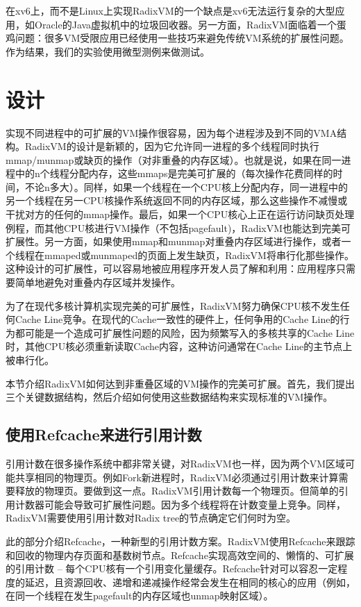 在xv6上，而不是Linux上实现RadixVM的一个缺点是xv6无法运行复杂的大型应用，如Oracle的Java虚拟机中的垃圾回收器。另一方面，RadixVM面临着一个蛋鸡问题：很多VM受限应用已经使用一些技巧来避免传统VM系统的扩展性问题。作为结果，我们的实验使用微型测例来做测试。


\section{设计}
实现不同进程中的可扩展的VM操作很容易，因为每个进程涉及到不同的VMA结构。RadixVM的设计是新颖的，因为它允许同一进程的多个线程同时执行mmap/munmap或缺页的操作（对非重叠的内存区域）。也就是说，如果在同一进程中的n个线程分配内存，这些mmaps是完美可扩展的（每次操作花费同样的时间，不论n多大）。同样，如果一个线程在一个CPU核上分配内存，同一进程中的另一个线程在另一CPU核操作系统返回不同的内存区域，那么这些操作不减慢或干扰对方的任何的mmap操作。最后，如果一个CPU核心上正在运行访问缺页处理例程，而其他CPU核进行VM操作（不包括pagefault)，RadixVM也能达到完美可扩展性。另一方面，如果使用mmap和munmap对重叠内存区域进行操作，或者一个线程在mmaped或munmaped的页面上发生缺页，RadixVM将串行化那些操作。这种设计的可扩展性，可以容易地被应用程序开发人员了解和利用：应用程序只需要简单地避免对重叠内存区域并发操作。

为了在现代多核计算机实现完美的可扩展性，RadixVM努力确保CPU核不发生任何Cache
Line竞争。在现代的Cache一致性的硬件上，任何争用的Cache
Line的行为都可能是一个造成可扩展性问题的风险，因为频繁写入的多核共享的Cache
Line时，其他CPU核必须重新读取Cache内容，这种访问通常在Cache
Line的主节点上被串行化。

本节介绍RadixVM如何达到非重叠区域的VM操作的完美可扩展。首先，我们提出三个关键数据结构，然后介绍如何使用这些数据结构来实现标准的VM操作。

\subsection{使用Refcache来进行引用计数}
引用计数在很多操作系统中都非常关键，对RadixVM也一样，因为两个VM区域可能共享相同的物理页。例如Fork新进程时，RadixVM必须通过引用计数来计算需要释放的物理页。要做到这一点。RadixVM引用计数每一个物理页。但简单的引用计数器可能会导致可扩展性问题。因为多个线程将在计数变量上竞争。同样，RadixVM需要使用引用计数对Radix
tree的节点确定它们何时为空。

此的部分介绍Refcache，一种新型的引用计数方案。RadixVM使用Refcache来跟踪和回收的物理内存页面和基数树节点。Refcache实现高效空间的、懒惰的、可扩展的引用计数
--
每个CPU核有一个引用变化量缓存。Refcache针对可以容忍一定程度的延迟，且资源回收、递增和递减操作经常会发生在相同的核心的应用（例如，在同一个线程在发生pagefault的内存区域也unmap映射区域）。

